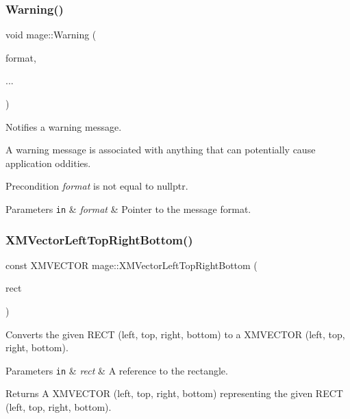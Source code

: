 \subsubsection{\texorpdfstring{Warning()}{Warning()}}
{\footnotesize\ttfamily void mage\+::\+Warning (\begin{DoxyParamCaption}\item[{const char $\ast$}]{format,  }\item[{}]{... }\end{DoxyParamCaption})}

Notifies a warning message.

A warning message is associated with anything that can potentially cause application oddities.

\begin{DoxyPrecond}{Precondition}
{\itshape format} is not equal to {\ttfamily nullptr}. 
\end{DoxyPrecond}

\begin{DoxyParams}[1]{Parameters}
\mbox{\tt in}  & {\em format} & Pointer to the message format. \\
\hline
\end{DoxyParams}
\hypertarget{namespacemage_aa049ddf42f2937d6bc7f730f4eabf57a}{}\label{namespacemage_aa049ddf42f2937d6bc7f730f4eabf57a} 
\subsubsection{\texorpdfstring{X\+M\+Vector\+Left\+Top\+Right\+Bottom()}{XMVectorLeftTopRightBottom()}}
{\footnotesize\ttfamily const X\+M\+V\+E\+C\+T\+OR mage\+::\+X\+M\+Vector\+Left\+Top\+Right\+Bottom (\begin{DoxyParamCaption}\item[{const R\+E\+CT \&}]{rect }\end{DoxyParamCaption})}

Converts the given {\ttfamily R\+E\+CT} (left, top, right, bottom) to a {\ttfamily X\+M\+V\+E\+C\+T\+OR} (left, top, right, bottom).


\begin{DoxyParams}[1]{Parameters}
\mbox{\tt in}  & {\em rect} & A reference to the rectangle. \\
\hline
\end{DoxyParams}
\begin{DoxyReturn}{Returns}
A {\ttfamily X\+M\+V\+E\+C\+T\+OR} (left, top, right, bottom) representing the given {\ttfamily R\+E\+CT} (left, top, right, bottom). 
\end{DoxyReturn}
\hypertarget{namespacemage_a21b11fa85a84f903e3bd4678bf655270}{}\label{namespacemage_a21b11fa85a84f903e3bd4678bf655270} 
